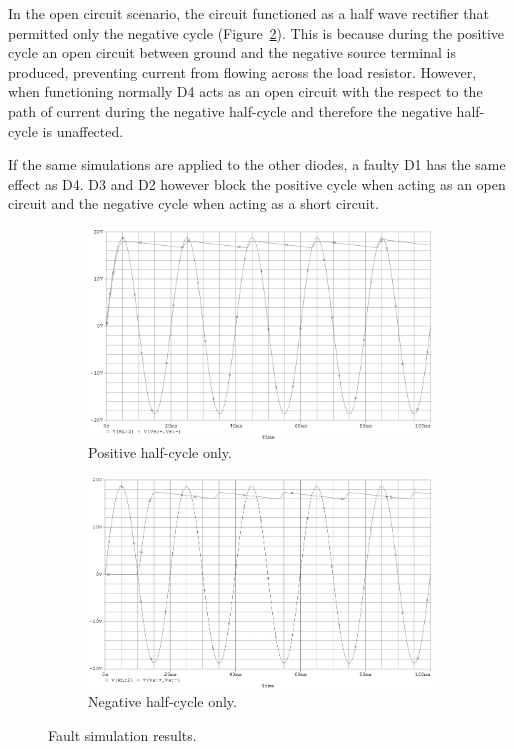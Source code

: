 \documentclass[12pt]{article}
\begin{document}
In the open circuit scenario, the circuit functioned as a half wave rectifier that permitted only the negative cycle (Figure~\ref{fig:neg}). This is because during the positive cycle an open circuit between ground and the negative source terminal is produced, preventing current from flowing across the load resistor. However, when functioning normally D4 acts as an open circuit with the respect to the path of current during the negative half-cycle and therefore the negative half-cycle is unaffected.

If the same simulations are applied to the other diodes, a faulty D1 has the same effect as D4. D3 and D2 however block the positive cycle when acting as an open circuit and the negative cycle when acting as a short circuit.
\begin{figure}[h!]
\centering
\begin{subfigure}[b]{0.7\textwidth}
\includegraphics[width=\textwidth]{out_pos}
\caption{Positive half-cycle only.}
\label{fig:pos}
\end{subfigure}
\qquad
\begin{subfigure}[b]{0.7\textwidth}
\includegraphics[width=\textwidth]{out_neg}
\caption{Negative half-cycle only.}
\label{fig:neg}
\end{subfigure}
\caption{Fault simulation results.}
\label{fig:fault}
\end{figure}
\end{document}

